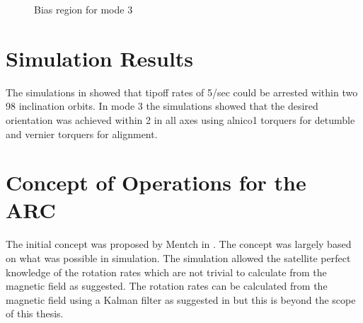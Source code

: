 \begin{figure}[htb!]
    \caption{Bias region for mode 3}
    \label{fig:m3b}
\end{figure}

\section{Simulation Results}

The simulations in \cite{Mentch11} showed that tipoff rates of 5\textdegree/sec could be arrested within two 98\textdegree{} inclination orbits. In mode 3 the simulations showed that the desired orientation was achieved within 2\textdegree{} in all axes using alnico1 torquers for detumble and vernier torquers for alignment.


\section{Concept of Operations for the \acl*{ARC}}

The initial concept was proposed by Mentch in \cite{Mentch11}. The concept was largely based on what was possible in simulation. The simulation allowed the satellite perfect knowledge of the rotation rates which are not trivial to calculate from the magnetic field as suggested. The rotation rates can be calculated from the magnetic field using a Kalman filter as suggested in \cite{Sturm05} but this is beyond the scope of this thesis.

